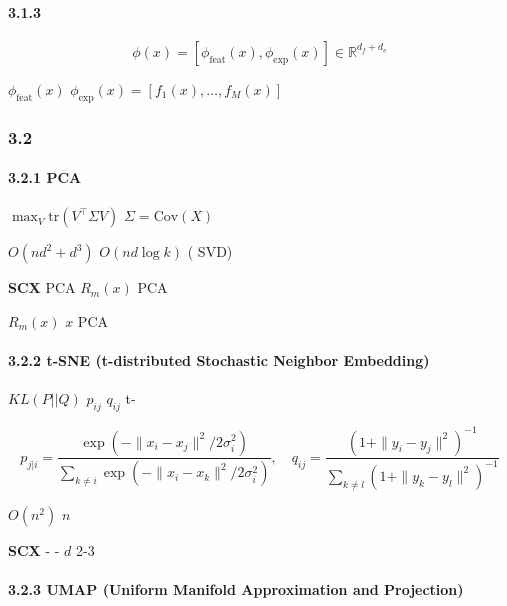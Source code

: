 \documentclass[
  12pt,
]{article}
\begin{document}
\paragraph{3.1.3
}\label{ux63a8ux8350ux65b9ux6848ux53ccux89c6ux56feux5d4cux5165}



\[\phi(x) = [\phi_{\text{feat}}(x), \phi_{\text{exp}}(x)] \in \mathbb{R}^{d_f + d_e}\]

 \(\phi_{\text{feat}}(x)\)
\(\phi_{\text{exp}}(x) = [f_1(x), \ldots, f_M(x)]\)


\subsubsection{3.2
}\label{ux964dux7ef4ux65b9ux6cd5ux5bf9ux6bd4ux5206ux6790}

\paragraph{3.2.1
PCA}\label{pcaux4e3bux6210ux5206ux5206ux6790}

\textbf{}
\(\max_{V} \text{tr}(V^\top \Sigma V)\)
\(\Sigma = \text{Cov}(X)\)

\textbf{}\(O(n d^2 + d^3)\)  \(O(n d \log k)\) ( SVD)

\textbf{SCX }PCA 
\(R_m(x)\) PCA 

\textbf{}\(R_m(x)\)  \(x\) PCA


\paragraph{3.2.2 t-SNE (t-distributed Stochastic Neighbor
Embedding)}\label{t-sne-t-distributed-stochastic-neighbor-embedding}

\textbf{} \(KL(P||Q)\) \(p_{ij}\)
\(q_{ij}\)  t-

\[p_{j|i} = \frac{\exp(-\|x_i - x_j\|^2 / 2\sigma_i^2)}{\sum_{k \neq i} \exp(-\|x_i - x_k\|^2 / 2\sigma_i^2)}, \quad q_{ij} = \frac{(1 + \|y_i - y_j\|^2)^{-1}}{\sum_{k \neq l} (1 + \|y_k - y_l\|^2)^{-1}}\]

\textbf{}\(O(n^2)\) \(n\) 

\textbf{SCX } -
 -
\(d\)  2-3 

\paragraph{3.2.3 UMAP (Uniform Manifold Approximation and
Projection)}\label{umap-uniform-manifold-approximation-and-projection}
\end{document}
